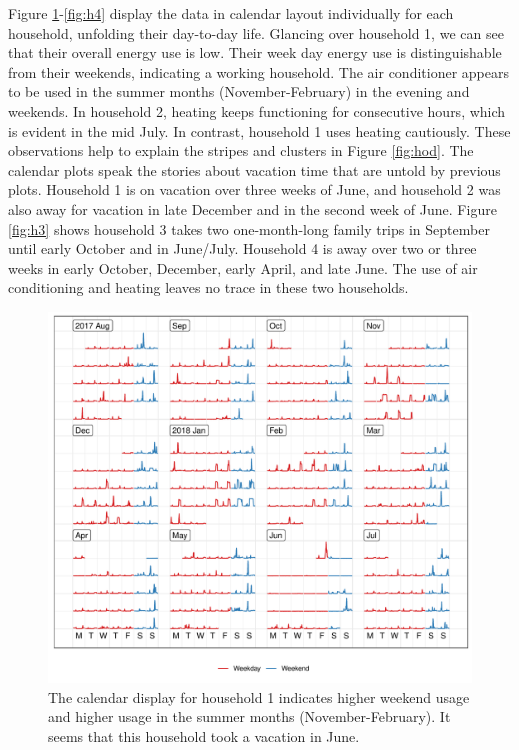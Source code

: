 \documentclass[12pt]{article}
\begin{document}
Figure \ref{fig:h1}-\ref{fig:h4} display the data in calendar layout individually for each household, unfolding their day-to-day life. Glancing over household 1, we can see that their overall energy use is low. Their week day energy use is distinguishable from their weekends, indicating a working household. The air conditioner appears to be used in the summer months (November-February) in the evening and weekends. In household 2, heating keeps functioning for consecutive hours, which is evident in the mid July. In contrast, household 1 uses heating cautiously. These observations help to explain the stripes and clusters in Figure \ref{fig:hod}. The calendar plots speak the stories about vacation time that are untold by previous plots. Household 1 is on vacation over three weeks of June, and household 2 was also away for vacation in late December and in the second week of June. Figure \ref{fig:h3} shows household 3 takes two one-month-long family trips in September until early October and in June/July. Household 4 is away over two or three weeks in early October, December, early April, and late June. The use of air conditioning and heating leaves no trace in these two households.

\begin{figure}

{\centering \includegraphics[width=\textwidth]{figure/h1-1} 

}

\caption{The calendar display for household 1 indicates higher weekend usage and higher usage in the summer months (November-February). It seems that this household took a vacation in June.}\label{fig:h1}
\end{figure}
\end{document}

